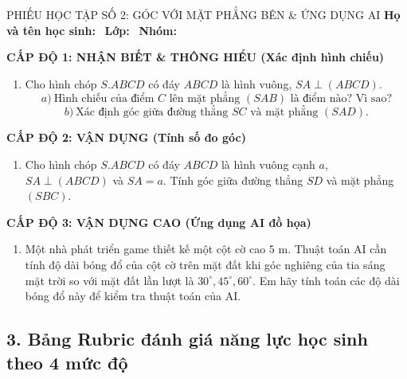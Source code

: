 \documentclass[12pt, a4paper]{article}
\begin{document}
\begin{pedabox}{PHIẾU HỌC TẬP SỐ 2: GÓC VỚI MẶT PHẲNG BÊN \& ỨNG DỤNG AI}
\textbf{Họ và tên học sinh:} \dotfill \ \textbf{Lớp:} \dotfill \ \textbf{Nhóm:} \dotfill

\noindent \textbf{CẤP ĐỘ 1: NHẬN BIẾT \& THÔNG HIỂU (Xác định hình chiếu)}
\begin{enumerate}[leftmargin=0.6cm]
    \item Cho hình chóp $S.ABCD$ có đáy $ABCD$ là hình vuông, $SA \perp (ABCD)$.
    $$a) \ \text{Hình chiếu của điểm } C \text{ lên mặt phẳng } (SAB) \text{ là điểm nào? Vì sao?}$$
    $$b) \ \text{Xác định góc giữa đường thẳng } SC \text{ và mặt phẳng } (SAD).$$
\end{enumerate}

\noindent \textbf{CẤP ĐỘ 2: VẬN DỤNG (Tính số đo góc)}
\begin{enumerate}[leftmargin=0.6cm]
    \item Cho hình chóp $S.ABCD$ có đáy $ABCD$ là hình vuông cạnh $a$, $SA \perp (ABCD)$ và $SA = a$.
    Tính góc giữa đường thẳng $SD$ và mặt phẳng $(SBC)$.
\end{enumerate}

\noindent \textbf{CẤP ĐỘ 3: VẬN DỤNG CAO (Ứng dụng AI đồ họa)}
\begin{enumerate}[leftmargin=0.6cm]
    \item Một nhà phát triển game thiết kế một cột cờ cao $5\text{ m}$. Thuật toán AI cần tính độ dài bóng đổ của cột cờ trên mặt đất khi góc nghiêng của tia sáng mặt trời so với mặt đất lần lượt là $30^\circ, 45^\circ, 60^\circ$. Em hãy tính toán các độ dài bóng đổ này để kiểm tra thuật toán của AI.
\end{enumerate}
\end{pedabox}

\subsection*{3. Bảng Rubric đánh giá năng lực học sinh theo 4 mức độ}
\end{document}
